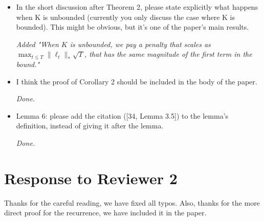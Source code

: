 \documentclass{article}
\begin{document}
\begin{itemize}
\item In the short discussion after Theorem 2, please state explicitly what happens when K is unbounded (currently you only discuss the case where K is bounded).  This might be obvious, but it's one of the paper's main results.

\emph{Added "When $K$ is unbounded, we pay a penalty that scales as $\max_{t \le T}
\|\ell_t\|_* \sqrt{T}$, that has the same magnitude of the first term in the
bound."}

\item I think the proof of Corollary 2 should be included in the body of the paper.

\emph{Done.}

\item Lemma 6: please add the citation ([34, Lemma 3.5]) to the lemma's definition, instead of giving it after the lemma. 

\emph{Done.}

\end{itemize}

\section{Response to Reviewer 2}

Thanks for the careful reading, we have fixed all typos. Also, thanks for the more direct proof for the recurrence, we
have included it in the paper.
\end{document}
